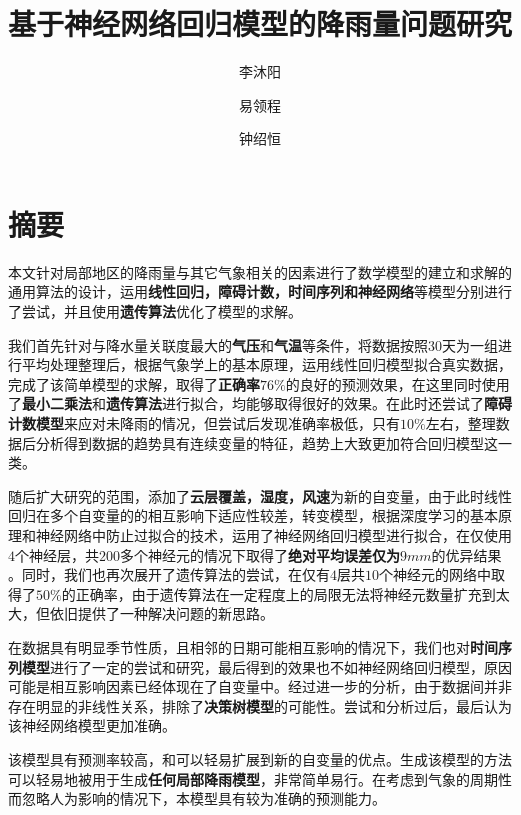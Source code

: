 \documentclass[UTF8]{ctexart}
\title{基于神经网络回归模型的降雨量问题研究}
\author{李沐阳 \and 易领程 \and 钟绍恒}
\begin{document}
  \maketitle

  \newpage

  \tableofcontents


  \newpage

  \section{摘要}

本文针对局部地区的降雨量与其它气象相关的因素进行了数学模型的建立和求解的通用算法的设计，运用\textbf{线性回归，障碍计数，时间序列和神经网络}等模型分别进行了尝试，并且使用\textbf{遗传算法}优化了模型的求解。

我们首先针对与降水量关联度最大的\textbf{气压}和\textbf{气温}等条件，将数据按照$30$天为一组进行平均处理整理后，根据气象学上的基本原理，运用线性回归模型拟合真实数据，完成了该简单模型的求解，取得了\textbf{正确率$76 \%$}的良好的预测效果，在这里同时使用了\textbf{最小二乘法}和\textbf{遗传算法}进行拟合，均能够取得很好的效果。在此时还尝试了\textbf{障碍计数模型}来应对未降雨的情况，但尝试后发现准确率极低，只有$10\%$左右，整理数据后分析得到数据的趋势具有连续变量的特征，趋势上大致更加符合回归模型这一类。

随后扩大研究的范围，添加了\textbf{云层覆盖，湿度，风速}为新的自变量，由于此时线性回归在多个自变量的的相互影响下适应性较差，转变模型，根据深度学习的基本原理和神经网络中防止过拟合的技术，运用了神经网络回归模型进行拟合，在仅使用$4$个神经层，共$200$多个神经元的情况下取得了\textbf{绝对平均误差仅为$9mm$}的优异结果 。同时，我们也再次展开了遗传算法的尝试，在仅有$4$层共$10$个神经元的网络中取得了$50\%$的正确率，由于遗传算法在一定程度上的局限无法将神经元数量扩充到太大，但依旧提供了一种解决问题的新思路。

在数据具有明显季节性质，且相邻的日期可能相互影响的情况下，我们也对\textbf{时间序列模型}进行了一定的尝试和研究，最后得到的效果也不如神经网络回归模型，原因可能是相互影响因素已经体现在了自变量中。经过进一步的分析，由于数据间并非存在明显的非线性关系，排除了\textbf{决策树模型}的可能性。尝试和分析过后，最后认为该神经网络模型更加准确。

该模型具有预测率较高，和可以轻易扩展到新的自变量的优点。生成该模型的方法可以轻易地被用于生成\textbf{任何局部降雨模型}，非常简单易行。在考虑到气象的周期性而忽略人为影响的情况下，本模型具有较为准确的预测能力。
\end{document}
